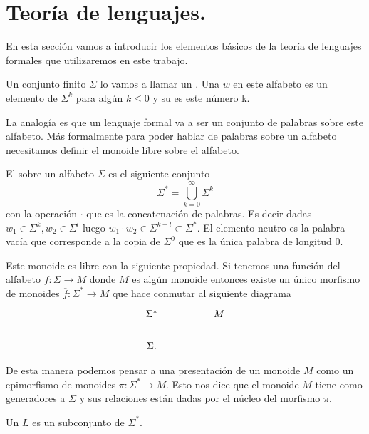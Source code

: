 \documentclass[tesis.tex]{subfiles}
\begin{document}
\chapter{Teoría de lenguajes.}	
En esta sección vamos a introducir los elementos básicos de la teoría de lenguajes formales que utilizaremos en este trabajo. 
\begin{deff}
Un conjunto finito $\Sigma$ lo vamos a llamar un . Una  $w$ en este alfabeto es un elemento de $\Sigma^k$ para algún $k \le 0$ y su  es este número k.
\end{deff}
La analogía es que un lenguaje formal va a ser un conjunto de palabras sobre este alfabeto. Más formalmente para poder hablar de palabras sobre un alfabeto necesitamos definir el monoide libre sobre el alfabeto.
\begin{deff}
	El  sobre un alfabeto $\Sigma$ es el siguiente conjunto
	\[
	\Sigma^{*} = \bigcup_{k=0}^{\infty} \Sigma^k
	\]
	con la operación $\cdot$ que es la concatenación de palabras. Es decir dadas $w_1 \in \Sigma^{k}, w_2 \in \Sigma^{l}$ luego $w_1 \cdot w_2 \in \Sigma^{k+l} \subset \Sigma^*$. El elemento neutro es la palabra vacía que corresponde a la copia de $\Sigma^0$ que es la única palabra de longitud $0$. 
\end{deff}

\begin{obs}
	Este monoide es libre con la siguiente propiedad. Si tenemos una función del alfabeto $f: \Sigma \to M$ donde $M$ es algún monoide entonces existe un único morfismo de monoides $\overline f: \Sigma^{*} \to M$ que hace conmutar al siguiente diagrama
	\[\begin{tikzcd}
	\Sigma^{*} && M \\
	\Sigma.
	\end{tikzcd}\]
	
	
\end{obs}

\begin{obs}
	De esta manera podemos pensar a una {presentación} de un monoide $M$  como un epimorfismo de monoides $\pi: \Sigma^{*} \to M$. Esto nos dice que el monoide $M$ tiene como generadores a $\Sigma$ y sus relaciones están dadas por el núcleo del morfismo $\pi$.
\end{obs}

\begin{deff}
	Un  $L$ es un subconjunto de $\Sigma^{*}$. 
\end{deff}
\end{document}
